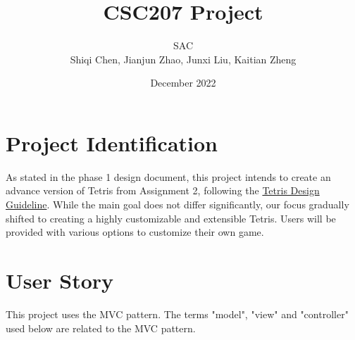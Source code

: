 \documentclass{article}
\title{CSC207 Project}
\author{SAC \\ Shiqi Chen, Jianjun Zhao, Junxi Liu, Kaitian Zheng}
\date{December 2022}
\begin{document}
\maketitle


\section{Project Identification}

As stated in the phase 1 design document, this project intends to create an advance version of Tetris from Assignment 2, following the \href{https://tetris.wiki/Tetris_Guideline}{Tetris Design Guideline}. While the main goal does not differ significantly, our focus gradually shifted to creating a highly customizable and extensible Tetris. Users will be provided with various options to customize their own game.

\section{User Story}
This project uses the MVC pattern. The terms "model", "view" and "controller" used below are related to the MVC pattern.
\end{document}
